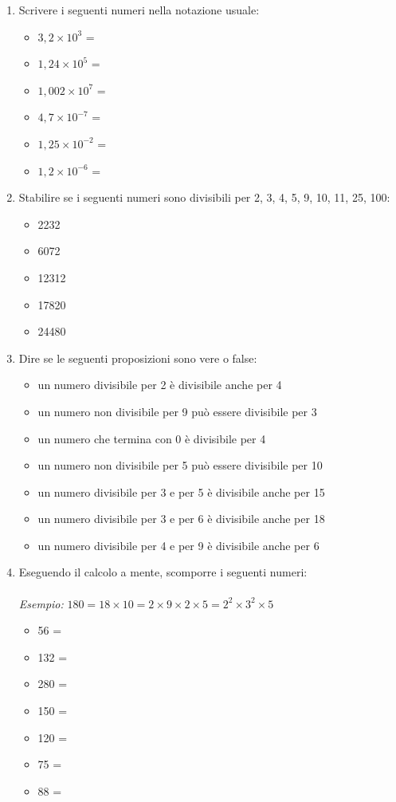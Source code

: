 \documentclass[]{article}
\newcommand*\vf {\hspace*{0em plus 1fill}\makebox{V \quad F}}
\begin{document}
\begin{enumerate}
	\item {Scrivere i seguenti numeri nella notazione usuale:
	\begin{itemize}
		\item \(3,2 \times 10^3\) =
		\item \(1,24 \times 10^5\) =
		\item \(1,002 \times 10^7\) =
		\item \(4,7 \times 10^{-7}\) =
		\item \(1,25 \times 10^{-2}\) =
		\item \(1,2 \times 10^{-6}\) =
	\end{itemize}	
	}
	
	\item {Stabilire se i seguenti numeri sono divisibili per 2, 3, 4, 5, 9, 10, 11, 25, 100:
		\begin{itemize}
			\item 2232
			\item 6072
			\item 12312
			\item 17820
			\item 24480
		\end{itemize}
	}
	
	\item {Dire se le seguenti proposizioni sono vere o false:
	\begin{itemize}
		\item {un numero divisibile per 2 è divisibile anche per 4} \vf
		\item {un numero non divisibile per 9 può essere divisibile per 3} \vf
		\item {un numero che termina con 0 è divisibile per 4} \vf
		\item {un numero non divisibile per 5 può essere divisibile per 10} \vf
		\item {un numero divisibile per 3 e per 5 è divisibile anche per 15} \vf
		\item {un numero divisibile per 3 e per 6 è divisibile anche per 18} \vf
		\item {un numero divisibile per 4 e per 9 è divisibile anche per 6} \vf
	\end{itemize}
	}


	\item {Eseguendo il calcolo a mente, scomporre i seguenti numeri: \\ \\ \textit{Esempio: }\(180 = 18 \times 10 = 2 \times 9 \times 2 \times 5 = 2^2 \times 3^2 	\times 5\)
		\begin{itemize}
			\item 56 =
			\item 132 =
			\item 280 =
			\item 150 =
			\item 120 =
			\item 75 =
			\item 88 =
		\end{itemize}
	}


\end{enumerate}
\end{document}

